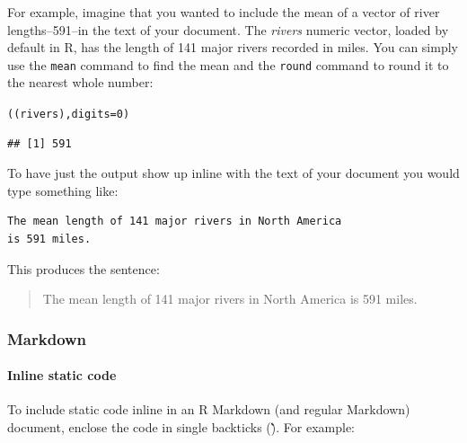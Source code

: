For example, imagine that you wanted to include the mean of a vector of river lengths--591--in the text of your document. The {\emph{rivers}} numeric vector, loaded by default in R, has the length of 141 major rivers recorded in miles. You can simply use the {\tt{mean}} command to find the mean and the {\tt{round}} command to round it to the nearest whole number:

\begin{knitrout}
\color{fgcolor}\begin{kframe}
\begin{alltt}
((rivers), digits = 0)
\end{alltt}
\begin{verbatim}
## [1] 591
\end{verbatim}
\end{kframe}
\end{knitrout}


\noindent To have just the output show up inline with the text of your document you would type something like:

\begin{knitrout}
    \color{fgcolor}
    \begin{kframe}
        \begin{verbatim}
The mean length of 141 major rivers in North America
is 591 miles. 
            \end{verbatim}
        \end{kframe}
\end{knitrout}

\noindent This produces the sentence:

\begin{quote}
    The mean length of 141 major rivers in North America is 591 miles. 
\end{quote}

\subsubsection{Markdown}

\paragraph{Inline static code}

To include static code inline in an R Markdown (and regular Markdown) document, enclose the code in single backticks (\` \`). For example:

